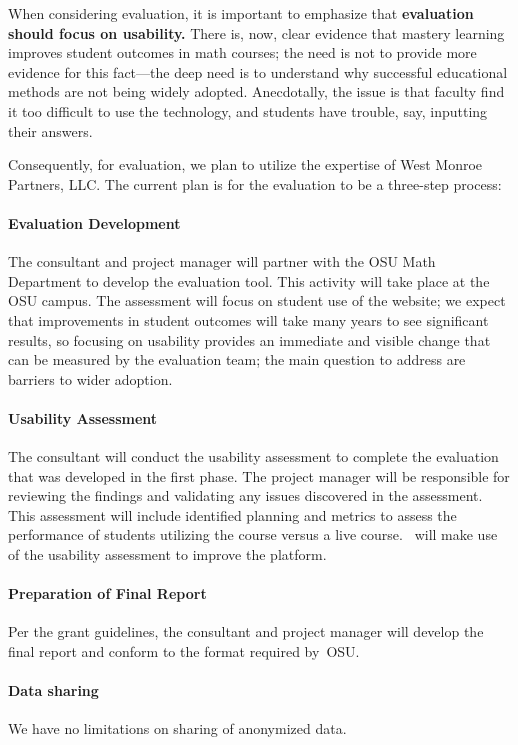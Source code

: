 When considering evaluation, it is important to emphasize that
\textbf{evaluation should focus on usability.}  There is, now, clear
evidence that mastery learning improves student outcomes in math
courses; the need is not to provide more evidence for this fact---the
deep need is to understand why successful educational methods are not
being widely adopted.  Anecdotally, the issue is that faculty find it
too difficult to use the technology, and students have trouble, say,
inputting their answers.

Consequently, for evaluation, we plan to utilize the expertise of West Monroe
Partners, LLC. The current plan is for the evaluation to be a three-step process:
\paragraph{Evaluation Development} The consultant and project
  manager will partner with the OSU Math Department to develop the
  evaluation tool.  This activity will take place at the OSU campus.  The assessment will focus on student use of the website; we expect that improvements in student outcomes will take many years to see significant results, so focusing on usability provides an immediate and visible change that can be measured by the evaluation team; the main question to address are barriers to wider adoption.
\paragraph{Usability Assessment} The consultant will conduct the usability
  assessment to complete the evaluation that was developed in the
  first phase.  The project manager will be responsible for reviewing
  the findings and validating any issues discovered in the assessment.
  This assessment will include identified planning and metrics to
  assess the performance of students utilizing the course versus a
  live course.  \gratisu\ will make use of the usability assessment to improve the platform.
\paragraph{Preparation of Final Report} Per the grant guidelines, the
  consultant and project manager will develop the final report and
  conform to the format required by~OSU.

\paragraph{Data sharing} We have no limitations on sharing of anonymized data.
